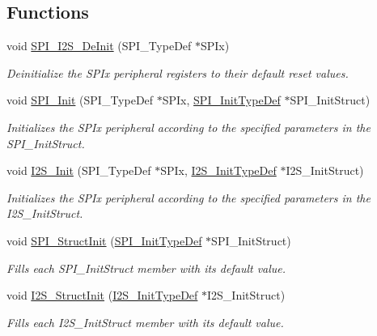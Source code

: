 \subsection*{Functions}
\begin{DoxyCompactItemize}
\item 
void \hyperlink{group___s_p_i_gabe36880945fa56785283a9c0092124cc}{S\-P\-I\-\_\-\-I2\-S\-\_\-\-De\-Init} (S\-P\-I\-\_\-\-Type\-Def $\ast$S\-P\-Ix)
\begin{DoxyCompactList}\small\item\em Deinitialize the S\-P\-Ix peripheral registers to their default reset values. \end{DoxyCompactList}\item 
void \hyperlink{group___s_p_i_ga8dacc1dc48bf08c0f12da409f4889037}{S\-P\-I\-\_\-\-Init} (S\-P\-I\-\_\-\-Type\-Def $\ast$S\-P\-Ix, \hyperlink{struct_s_p_i___init_type_def}{S\-P\-I\-\_\-\-Init\-Type\-Def} $\ast$S\-P\-I\-\_\-\-Init\-Struct)
\begin{DoxyCompactList}\small\item\em Initializes the S\-P\-Ix peripheral according to the specified parameters in the S\-P\-I\-\_\-\-Init\-Struct. \end{DoxyCompactList}\item 
void \hyperlink{group___s_p_i_ga53661884ae4a9640df7cbc59187782f7}{I2\-S\-\_\-\-Init} (S\-P\-I\-\_\-\-Type\-Def $\ast$S\-P\-Ix, \hyperlink{struct_i2_s___init_type_def}{I2\-S\-\_\-\-Init\-Type\-Def} $\ast$I2\-S\-\_\-\-Init\-Struct)
\begin{DoxyCompactList}\small\item\em Initializes the S\-P\-Ix peripheral according to the specified parameters in the I2\-S\-\_\-\-Init\-Struct. \end{DoxyCompactList}\item 
void \hyperlink{group___s_p_i_ga9a0116f88cc2c4478c270f05608703f1}{S\-P\-I\-\_\-\-Struct\-Init} (\hyperlink{struct_s_p_i___init_type_def}{S\-P\-I\-\_\-\-Init\-Type\-Def} $\ast$S\-P\-I\-\_\-\-Init\-Struct)
\begin{DoxyCompactList}\small\item\em Fills each S\-P\-I\-\_\-\-Init\-Struct member with its default value. \end{DoxyCompactList}\item 
void \hyperlink{group___s_p_i_ga7470ec1d0759fdeeb42c7fe71a3b41b7}{I2\-S\-\_\-\-Struct\-Init} (\hyperlink{struct_i2_s___init_type_def}{I2\-S\-\_\-\-Init\-Type\-Def} $\ast$I2\-S\-\_\-\-Init\-Struct)
\begin{DoxyCompactList}\small\item\em Fills each I2\-S\-\_\-\-Init\-Struct member with its default value. \end{DoxyCompactList}\item 

\end{DoxyCompactItemize}

